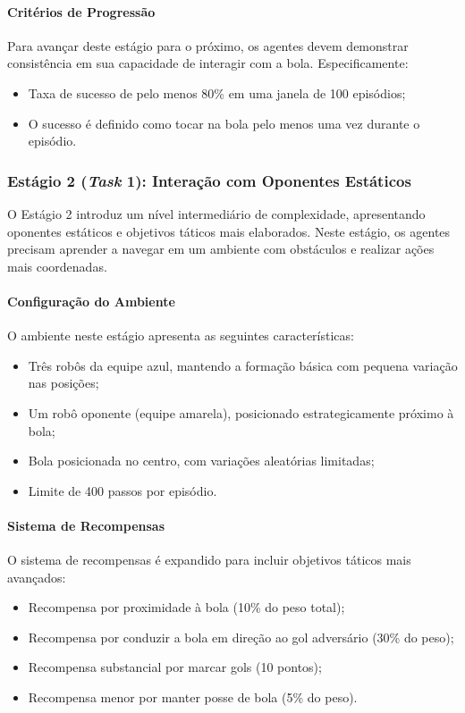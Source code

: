 \paragraph{Critérios de Progressão}

Para avançar deste estágio para o próximo, os agentes devem demonstrar consistência em sua capacidade de interagir com a bola. Especificamente:
\begin{itemize}
    \item Taxa de sucesso de pelo menos 80\% em uma janela de 100 episódios;
    \item O sucesso é definido como tocar na bola pelo menos uma vez durante o episódio.
\end{itemize}

\subsubsection{Estágio 2 (\textit{Task} 1): Interação com Oponentes Estáticos}
\label{subsubsec:estagio2}

O Estágio 2 introduz um nível intermediário de complexidade, apresentando oponentes estáticos e objetivos táticos mais elaborados. Neste estágio, os agentes precisam aprender a navegar em um ambiente com obstáculos e realizar ações mais coordenadas.

\paragraph{Configuração do Ambiente}

O ambiente neste estágio apresenta as seguintes características:
\begin{itemize}
    \item Três robôs da equipe azul, mantendo a formação básica com pequena variação nas posições;
    \item Um robô oponente (equipe amarela), posicionado estrategicamente próximo à bola;
    \item Bola posicionada no centro, com variações aleatórias limitadas;
    \item Limite de 400 passos por episódio.
\end{itemize}

\paragraph{Sistema de Recompensas}

O sistema de recompensas é expandido para incluir objetivos táticos mais avançados:
\begin{itemize}
    \item Recompensa por proximidade à bola (10\% do peso total);
    \item Recompensa por conduzir a bola em direção ao gol adversário (30\% do peso);
    \item Recompensa substancial por marcar gols (10 pontos);
    \item Recompensa menor por manter posse de bola (5\% do peso).
\end{itemize}

